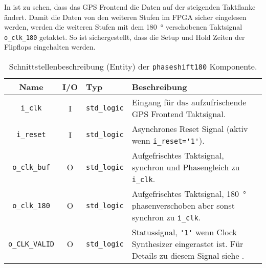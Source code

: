 In  ist zu sehen, dass das GPS Frontend die Daten auf der steigenden Taktflanke ändert. Damit die Daten von den weiteren Stufen im FPGA sicher eingelesen werden, werden die weiteren Stufen mit dem \SI{180}{\degree} verschobenen Taktsignal \lstinline$o_clk_180$ getaktet. So ist sichergestellt, dass die Setup und Hold Zeiten der Flipflops eingehalten werden.


\begin{table}[htbp]
    \ttabbox
    {
        \caption[Clock Synthesizer Schnittstelle]{Schnittstellenbeschreibung (Entity) der \lstinline$phaseshift180$ Komponente.}
        \label{TabPhaseshift180_Entity}
    }
    {
    \begin{tabular}{c c  l p{5.8cm}}
        \toprule
        Name                    & I/O   & Typ                   & Beschreibung \\
        \midrule
        \lstinline$i_clk$       & I     & \lstinline$std_logic$ & Eingang für das aufzufrischende GPS Frontend Taktsignal. \\
        \lstinline$i_reset$     & I     & \lstinline$std_logic$ & Asynchrones Reset Signal (aktiv wenn \lstinline$i_reset='1'$). \\
        \lstinline$o_clk_buf$   & O     & \lstinline$std_logic$ & Aufgefrischtes Taktsignal, synchron und Phasengleich zu \lstinline$i_clk$. \\
        \lstinline$o_clk_180$   & O     & \lstinline$std_logic$ & Aufgefrischtes Taktsignal, \SI{180}{\degree} phasenverschoben aber sonst synchron zu \lstinline$i_clk$. \\
        \lstinline$o_CLK_VALID$ & O     & \lstinline$std_logic$ & Statussignal, \lstinline$'1'$ wenn Clock Synthesizer eingerastet ist. Für Details zu diesem Signal siehe \cite{SP6Clock}.\\
        \bottomrule
    \end{tabular}
}
\end{table}
